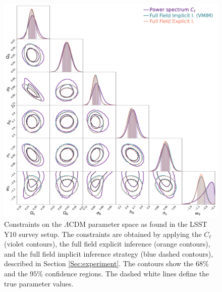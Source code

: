 \documentclass{aa}
\begin{document}
\begin{figure}
    \centering
        \includegraphics[width=\textwidth]{figures/contours_posterior_imp_ex_ps_dashed.pdf}
        \caption{
        Constraints on the $\Lambda$CDM parameter space as found in the LSST Y10 survey setup. The constraints are obtained by applying the $C_{\ell}$ (violet contours), the full field explicit inference (orange contours), and the full field implicit inference strategy (blue dashed contours), described in Section \ref{Sec:experiment}.
        The contours show the $68\%$ and the $95\%$  confidence regions. The dashed white lines define the true parameter values.}
        \label{fig:contours_posterior_imp_ex_ps}
\end{figure}
\end{document}
